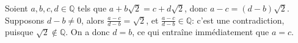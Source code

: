 Soient $a,b,c,d\in\mathbb{Q}$ tels que $a+b\sqrt{2}=c+d\sqrt{2}$, donc $a-c=(d-b)\sqrt{2}$. Supposons $d-b\neq 0$, alors $\frac{a-c}{d-b}=\sqrt{2}$, et $\frac{a-c}{d-b} \in \mathbb{Q}$: c'est une contradiction, puisque $\sqrt{2}\notin \mathbb{Q}$. On a donc $d=b$, ce qui entraîne immédiatement que $a=c$.
